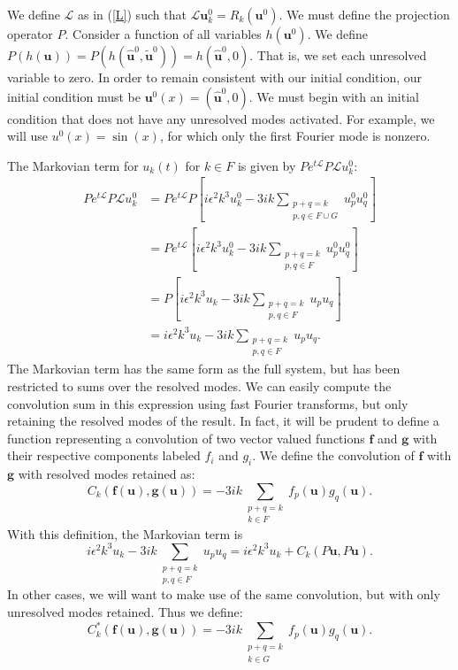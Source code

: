 \documentclass{article}
\begin{document}
We define $\mathcal{L}$ as in (\ref{L}) such that $\mathcal{L}\mathbf{u}_k^0 = R_k(\mathbf{u}^0)$. We must define the projection operator $P$. Consider a function of all variables $h(\mathbf{u}^0)$. We define $P(h(\mathbf{u}))=P(h(\hat{\mathbf{u}}^0,\tilde{\mathbf{u}}^0))=h(\hat{\mathbf{u}}^0,0)$. That is, we set each unresolved variable to zero. In order to remain consistent with our initial condition, our initial condition must be $\mathbf{u}^0(x) = (\hat{\mathbf{u}}^0,0)$. We must begin with an initial condition that does not have any unresolved modes activated. For example, we will use $u^0(x) = \sin(x)$, for which only the first Fourier mode is nonzero.

The Markovian term for $u_k(t)$ for $k\in F$ is given by $Pe^{t\mathcal{L}}P\mathcal{L}u_k^0$:
\begin{align*}
Pe^{t\mathcal{L}}P\mathcal{L}u_k^0&=Pe^{t\mathcal{L}}P\left[i\epsilon^2 k^3u_k^0-3ik\sum_{\substack{p+q=k\\p,q\in F\cup G}}u_p^0 u_q^0\right]\\
&=Pe^{t\mathcal{L}}\left[i\epsilon^2 k^3u_k^0-3ik\sum_{\substack{p+q=k\\p,q\in F}}u_p^0 u_q^0\right]\\
&=P\left[i\epsilon^2 k^3u_k-3ik\sum_{\substack{p+q=k\\p,q\in F}}u_p u_q\right]\\
&=i\epsilon^2 k^3u_k-3ik\sum_{\substack{p+q=k\\p,q\in F}}u_p u_q.
\end{align*}The Markovian term has the same form as the full system, but has been restricted to sums over the resolved modes. We can easily compute the convolution sum in this expression using fast Fourier transforms, but only retaining the resolved modes of the result. In fact, it will be prudent to define a function representing a convolution of two vector valued functions $\mathbf{f}$ and $\mathbf{g}$ with their respective components labeled $f_i$ and $g_i$. We define the convolution of $\mathbf{f}$ with $\mathbf{g}$ with resolved modes retained as:
\begin{equation}
C_k(\mathbf{f}(\mathbf{u}),\mathbf{g}(\mathbf{u})) = -3ik\sum_{\substack{p+q = k\\ k\in F}}f_p(\mathbf{u})g_q(\mathbf{u}).\label{convo}
\end{equation}With this definition, the Markovian term is
\[i\epsilon^2 k^3u_k - 3ik \sum_{\substack{p+q=k\\p,q\in F}}u_pu_q = i\epsilon^2 k^3 u_k + C_k(P\mathbf{u},P\mathbf{u}).
\]In other cases, we will want to make use of the same convolution, but with only unresolved modes retained. Thus we define:
\[C_k^*(\mathbf{f}(\mathbf{u}),\mathbf{g}(\mathbf{u})) = -3ik\sum_{\substack{p+q = k\\ k\in G}}f_p(\mathbf{u})g_q(\mathbf{u}).
\]
\end{document}
